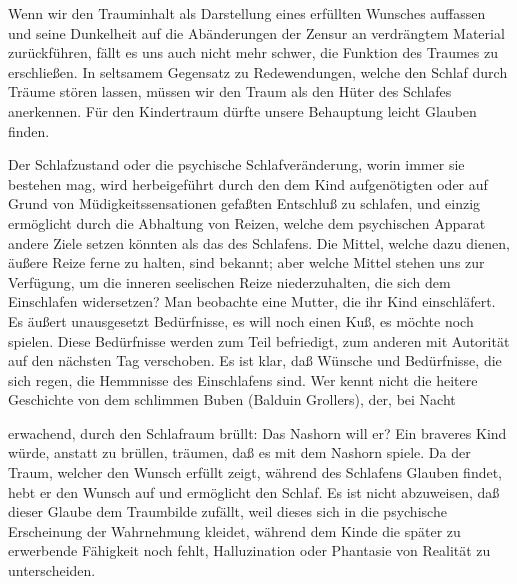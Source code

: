 \documentclass{article}
\begin{document}
            
        \pstart
        Wenn wir den Trauminhalt als Darstellung eines erfüllten Wunsches auffassen und
               seine Dunkelheit auf die Abänderungen der Zensur an verdrängtem Material
               zurückführen, fällt es uns auch nicht mehr schwer, die Funktion des Traumes zu
               erschließen. In seltsamem Gegensatz zu Redewendungen, welche den Schlaf
               durch Träume stören lassen, müssen wir den Traum als den
                  Hüter des Schlafes anerkennen. Für den Kindertraum dürfte unsere
               Behauptung leicht Glauben finden.
        \pend
    
            
        \pstart
        Der Schlafzustand oder die psychische Schlafveränderung, worin immer sie
               bestehen mag, wird herbeigeführt durch den dem Kind aufgenötigten oder auf Grund
               von Müdigkeitssensationen gefaßten Entschluß zu schlafen, und einzig ermöglicht
               durch die Abhaltung von Reizen, welche dem psychischen Apparat andere Ziele
               setzen könnten als das des Schlafens. Die Mittel, welche dazu dienen, äußere
               Reize ferne zu halten, sind bekannt; aber welche Mittel stehen uns zur
               Verfügung, um die inneren seelischen Reize niederzuhalten, die sich
               dem Einschlafen widersetzen? Man beobachte eine Mutter, die ihr Kind
               einschläfert. Es äußert unausgesetzt Bedürfnisse, es will noch einen Kuß, es
               möchte noch spielen. Diese Bedürfnisse werden zum Teil befriedigt, zum
               anderen mit Autorität auf den nächsten Tag verschoben. Es ist klar, daß
               Wünsche und Bedürfnisse, die sich regen, die Hemmnisse des Einschlafens sind.
               Wer kennt nicht die heitere Geschichte von dem schlimmen Buben (Balduin Grollers),
                  \edtext{}{\Bendnote{
                  \textbf{die heitere Geschichte von dem schlimmen Buben (Balduin Grollers)}]
                     Vom kleinen Rudi (1897), Roman von
                  Balduin Groller (d.i. Adalbert Goldscheider), dem Erfinder des österreichischen
                  Sherlock Holmes, alias Detektiv Dagobert Trostler. }}
     der, bei Nacht
        \pend
    
         
            
            
            
        \pstart
        erwachend, durch den Schlafraum brüllt: Das
                  Nashorn will er? Ein braveres Kind würde, anstatt zu brüllen, träumen, daß es mit dem Nashorn spiele. Da der
               Traum, welcher den Wunsch erfüllt zeigt, während des Schlafens Glauben findet, hebt er den Wunsch auf und
               ermöglicht den Schlaf. Es ist nicht abzuweisen, daß dieser Glaube dem
               Traumbilde zufällt, weil dieses sich in die psychische Erscheinung der
               Wahrnehmung kleidet, während dem Kinde die später zu erwerbende Fähigkeit
               noch fehlt, Halluzination oder Phantasie von Realität zu unterscheiden.
        \pend
    
\end{document}
